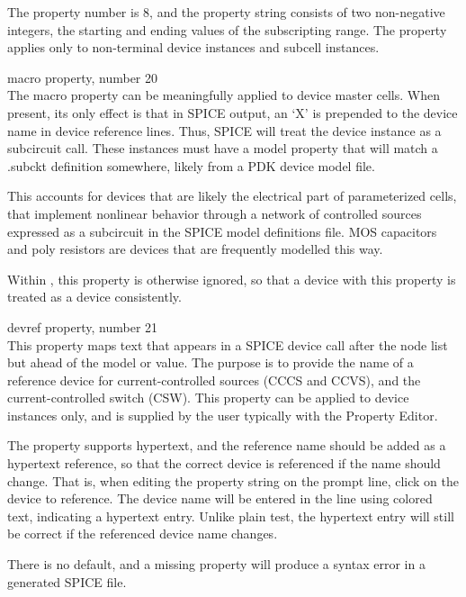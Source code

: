 \begin{description}
The property number is 8, and the property string consists of two
non-negative integers, the starting and ending values of the
subscripting range.  The property applies only to non-terminal device
instances and subcell instances.

\item{\vt macro} property, number 20\\
The {\et macro} property can be meaningfully applied to device master
cells.  When present, its only effect is that in SPICE output, an
`{\vt X}' is prepended to the device name in device reference lines. 
Thus, SPICE will treat the device instance as a subcircuit call. 
These instances must have a {\et model} property that will match a
{\vt .subckt} definition somewhere, likely from a PDK device model
file.

This accounts for devices that are likely the electrical part of
parameterized cells, that implement nonlinear behavior through a
network of controlled sources expressed as a subcircuit in the SPICE
model definitions file.  MOS capacitors and poly resistors are devices
that are frequently modelled this way.

Within {\Xic}, this property is otherwise ignored, so that a device
with this property is treated as a device consistently.

\item{\vt devref} property, number 21\\
This property maps text that appears in a SPICE device call after the
node list but ahead of the model or value.  The purpose is to provide
the name of a reference device for current-controlled sources (CCCS
and CCVS), and the current-controlled switch (CSW).  This property
can be applied to device instances only, and is supplied by the user
typically with the {\cb Property Editor}.

The property supports hypertext, and the reference name should be
added as a hypertext reference, so that the correct device is
referenced if the name should change.  That is, when editing the
property string on the prompt line, click on the device to reference. 
The device name will be entered in the line using colored text,
indicating a hypertext entry.  Unlike plain test, the hypertext entry
will still be correct if the referenced device name changes.
  
There is no default, and a missing property will produce a syntax
error in a generated SPICE file.
\end{description}


